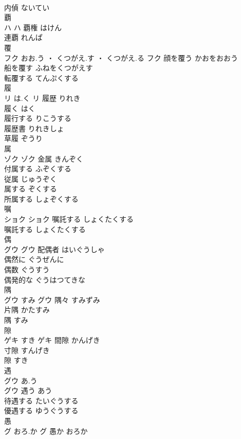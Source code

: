 \documentclass[8pt]{extreport}
\begin{document}
\begin{CJK}{UTF8}{min}
\\	内偵	ないてい	
\\	覇	
\\	ハ		ハ	覇権	はけん	
\\	連覇	れんぱ	
\\	覆	
\\	フク	おお.う ・ くつがえ.す ・ くつがえ.る	フク	顔を覆う	かおをおおう	
\\	船を覆す	ふねをくつがえす	
\\	転覆する	てんぷくする	
\\	履	
\\	リ	は.く	リ	履歴	りれき	
\\	履く	はく	
\\	履行する	りこうする	
\\	履歴書	りれきしょ	
\\	草履	ぞうり	
\\	属	
\\	ゾク		ゾク	金属	きんぞく	
\\	付属する	ふぞくする	
\\	従属	じゅうぞく	
\\	属する	ぞくする	
\\	所属する	しょぞくする	
\\	嘱	
\\	ショク		ショク	嘱託する	しょくたくする	
\\	嘱託する	しょくたくする	
\\	偶	
\\	グウ		グウ	配偶者	はいぐうしゃ	
\\	偶然に	ぐうぜんに	
\\	偶数	ぐうすう	
\\	偶発的な	ぐうはつてきな	
\\	隅	
\\	グウ	すみ	グウ	隅々	すみずみ	
\\	片隅	かたすみ	
\\	隅	すみ	
\\	隙	
\\	ゲキ	すき	ゲキ													間隙	かんげき	
\\	寸隙	すんげき	
\\	隙	すき	
\\	遇	
\\	グウ	あ.う
\\	グウ	遇う	あう	
\\	待遇する	たいぐうする	
\\	優遇する	ゆうぐうする	
\\	愚	
\\	グ	おろ.か	グ	愚か	おろか	

\end{CJK}
\end{document}
